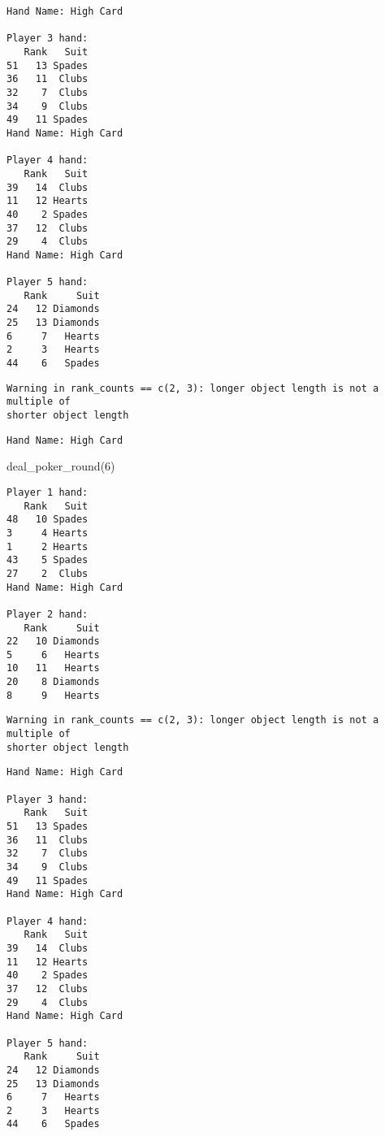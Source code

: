 \documentclass[
  letterpaper,
  DIV=11,
  numbers=noendperiod]{scrartcl}
\newenvironment{Shaded}{\begin{snugshade}}{\end{snugshade}}
\newcommand{\DecValTok}[1]{\textcolor[rgb]{0.68,0.00,0.00}{#1}}
\newcommand{\FunctionTok}[1]{\textcolor[rgb]{0.28,0.35,0.67}{#1}}
\newcommand{\NormalTok}[1]{\textcolor[rgb]{0.00,0.23,0.31}{#1}}
\begin{document}
\begin{verbatim}
Hand Name: High Card 

Player 3 hand: 
   Rank   Suit
51   13 Spades
36   11  Clubs
32    7  Clubs
34    9  Clubs
49   11 Spades
Hand Name: High Card 

Player 4 hand: 
   Rank   Suit
39   14  Clubs
11   12 Hearts
40    2 Spades
37   12  Clubs
29    4  Clubs
Hand Name: High Card 

Player 5 hand: 
   Rank     Suit
24   12 Diamonds
25   13 Diamonds
6     7   Hearts
2     3   Hearts
44    6   Spades
\end{verbatim}

\begin{verbatim}
Warning in rank_counts == c(2, 3): longer object length is not a multiple of
shorter object length
\end{verbatim}

\begin{verbatim}
Hand Name: High Card 
\end{verbatim}

\begin{Shaded}
\begin{Highlighting}[]
\FunctionTok{deal\_poker\_round}\NormalTok{(}\DecValTok{6}\NormalTok{)}
\end{Highlighting}
\end{Shaded}

\begin{verbatim}
Player 1 hand: 
   Rank   Suit
48   10 Spades
3     4 Hearts
1     2 Hearts
43    5 Spades
27    2  Clubs
Hand Name: High Card 

Player 2 hand: 
   Rank     Suit
22   10 Diamonds
5     6   Hearts
10   11   Hearts
20    8 Diamonds
8     9   Hearts
\end{verbatim}

\begin{verbatim}
Warning in rank_counts == c(2, 3): longer object length is not a multiple of
shorter object length
\end{verbatim}

\begin{verbatim}
Hand Name: High Card 

Player 3 hand: 
   Rank   Suit
51   13 Spades
36   11  Clubs
32    7  Clubs
34    9  Clubs
49   11 Spades
Hand Name: High Card 

Player 4 hand: 
   Rank   Suit
39   14  Clubs
11   12 Hearts
40    2 Spades
37   12  Clubs
29    4  Clubs
Hand Name: High Card 

Player 5 hand: 
   Rank     Suit
24   12 Diamonds
25   13 Diamonds
6     7   Hearts
2     3   Hearts
44    6   Spades
\end{verbatim}
\end{document}
